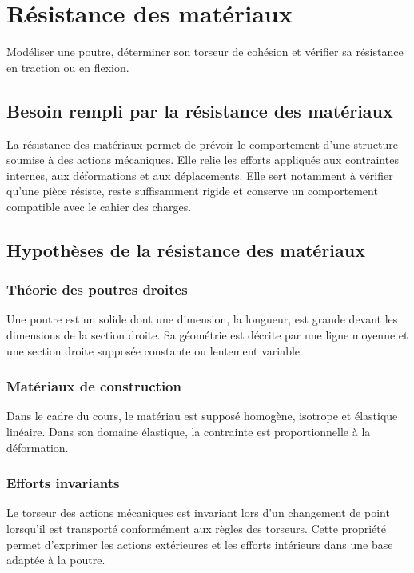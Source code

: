 \chapter{Résistance des matériaux}
\label{chap:rdm}

\begin{objectifs}
Modéliser une poutre, déterminer son torseur de cohésion et vérifier sa résistance en traction ou en flexion.
\end{objectifs}

\section{Besoin rempli par la résistance des matériaux}
La résistance des matériaux permet de prévoir le comportement d'une structure soumise à des actions mécaniques. Elle relie les efforts appliqués aux contraintes internes, aux déformations et aux déplacements. Elle sert notamment à vérifier qu'une pièce résiste, reste suffisamment rigide et conserve un comportement compatible avec le cahier des charges.

\section{Hypothèses de la résistance des matériaux}
\subsection{Théorie des poutres droites}
Une poutre est un solide dont une dimension, la longueur, est grande devant les dimensions de la section droite. Sa géométrie est décrite par une ligne moyenne et une section droite supposée constante ou lentement variable.
\TLPoutreReperee

\subsection{Matériaux de construction}
Dans le cadre du cours, le matériau est supposé homogène, isotrope et élastique linéaire. Dans son domaine élastique, la contrainte est proportionnelle à la déformation.

\subsection{Efforts invariants}
Le torseur des actions mécaniques est invariant lors d'un changement de point lorsqu'il est transporté conformément aux règles des torseurs. Cette propriété permet d'exprimer les actions extérieures et les efforts intérieurs dans une base adaptée à la poutre.

